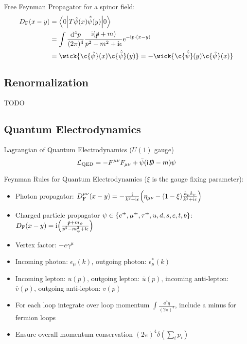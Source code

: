 			\noindent
			Free Feynman Propagator for a spinor field:
			\begin{equation}
				\begin{aligned}
					D_\text{F}(x-y) &= \mel**{0}{T\hat{\psi}(x)\hat{\bar\psi}(y)}{0} \\
					&= \int \frac{\dd^4 p}{(2\pi)^4} \frac{\i(\slashed{p}+m)}{p^2-m^2+\i\epsilon} \ex^{-\i p\cdot(x-y)} \\
					&= \wick{\c{\hat{\psi}}(x) \c{\hat{\bar{\psi}}}(y)} = - \wick{\c{\hat{\bar{\psi}}}(y) \c{\hat\psi}(x)}
				\end{aligned}
			\end{equation}
			
	\subsection{Renormalization}
		TODO

	\subsection{Quantum Electrodynamics}
		Lagrangian of Quantum Electrodynamics ($U(1)$ gauge)
		\begin{equation}
			\mathcal{L}_\mathrm{QED} = -F^{\mu\nu}F_{\mu\nu} + \bar{\psi}(\mathrm{i}\slashed{D}-m)\psi		
		\end{equation}

		\noindent
		Feynman Rules for Quantum Electrodynamics ($\xi$ is the gauge fixing parameter):
		\begin{itemize}\itemsep -0pt
			\item Photon propagator: $D_\text{F}^{\mu\nu}(x-y) = -\frac{\mathrm{i}}{k^2+\mathrm{i}\epsilon} \qty(\eta_{\mu\nu}-(1-\xi)\frac{k_\mu k_\nu}{k^2+\mathrm{i}\epsilon} )$
			\item Charged particle propagator $\psi \in \qty{e^\pm, \mu^\pm ,\tau^\pm, u,d,s,c,t,b}$: $D_\text{F}(x-y) = \mathrm{i}\qty(\frac{\slashed{p}+m_\psi}{p^2-m_\psi^2+\mathrm{i}\epsilon})$
			\item Vertex factor: $-e\gamma^\mu$
			\item Incoming photon: $\epsilon_\mu(k)$, outgoing photon: $\epsilon^{*}_\mu(k)$
			\item Incoming lepton: $u(p)$, outgoing lepton: $\bar{u}(p)$, incoming anti-lepton: $\bar{v}(p)$, outgoing anti-lepton: $v(p)$
			\item For each loop integrate over loop momentum $\int \frac{\dd^4 q}{(2\pi)^4}$, include a minus for fermion loops
			\item Ensure overall momentum conservation $(2\pi)^4 \delta(\sum_i p_i)$
		\end{itemize}


